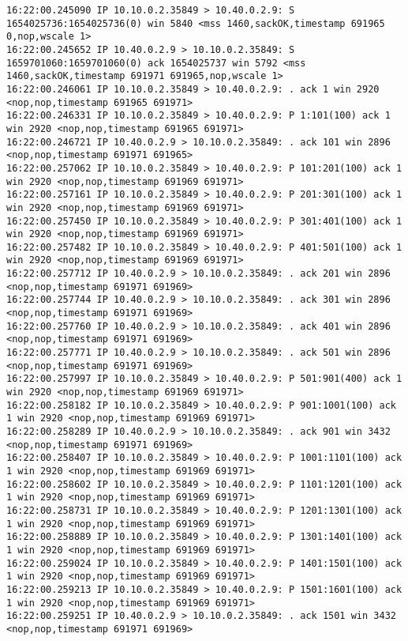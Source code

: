 \documentclass[a4paper,12pt]{article}
\begin{document}
\begin{Verbatim}
16:22:00.245090 IP 10.10.0.2.35849 > 10.40.0.2.9: S 1654025736:1654025736(0) win 5840 <mss 1460,sackOK,timestamp 691965 0,nop,wscale 1>
16:22:00.245652 IP 10.40.0.2.9 > 10.10.0.2.35849: S 1659701060:1659701060(0) ack 1654025737 win 5792 <mss 1460,sackOK,timestamp 691971 691965,nop,wscale 1>
16:22:00.246061 IP 10.10.0.2.35849 > 10.40.0.2.9: . ack 1 win 2920 <nop,nop,timestamp 691965 691971>
16:22:00.246331 IP 10.10.0.2.35849 > 10.40.0.2.9: P 1:101(100) ack 1 win 2920 <nop,nop,timestamp 691965 691971>
16:22:00.246721 IP 10.40.0.2.9 > 10.10.0.2.35849: . ack 101 win 2896 <nop,nop,timestamp 691971 691965>
16:22:00.257062 IP 10.10.0.2.35849 > 10.40.0.2.9: P 101:201(100) ack 1 win 2920 <nop,nop,timestamp 691969 691971>
16:22:00.257161 IP 10.10.0.2.35849 > 10.40.0.2.9: P 201:301(100) ack 1 win 2920 <nop,nop,timestamp 691969 691971>
16:22:00.257450 IP 10.10.0.2.35849 > 10.40.0.2.9: P 301:401(100) ack 1 win 2920 <nop,nop,timestamp 691969 691971>
16:22:00.257482 IP 10.10.0.2.35849 > 10.40.0.2.9: P 401:501(100) ack 1 win 2920 <nop,nop,timestamp 691969 691971>
16:22:00.257712 IP 10.40.0.2.9 > 10.10.0.2.35849: . ack 201 win 2896 <nop,nop,timestamp 691971 691969>
16:22:00.257744 IP 10.40.0.2.9 > 10.10.0.2.35849: . ack 301 win 2896 <nop,nop,timestamp 691971 691969>
16:22:00.257760 IP 10.40.0.2.9 > 10.10.0.2.35849: . ack 401 win 2896 <nop,nop,timestamp 691971 691969>
16:22:00.257771 IP 10.40.0.2.9 > 10.10.0.2.35849: . ack 501 win 2896 <nop,nop,timestamp 691971 691969>
16:22:00.257997 IP 10.10.0.2.35849 > 10.40.0.2.9: P 501:901(400) ack 1 win 2920 <nop,nop,timestamp 691969 691971>
16:22:00.258182 IP 10.10.0.2.35849 > 10.40.0.2.9: P 901:1001(100) ack 1 win 2920 <nop,nop,timestamp 691969 691971>
16:22:00.258289 IP 10.40.0.2.9 > 10.10.0.2.35849: . ack 901 win 3432 <nop,nop,timestamp 691971 691969>
16:22:00.258407 IP 10.10.0.2.35849 > 10.40.0.2.9: P 1001:1101(100) ack 1 win 2920 <nop,nop,timestamp 691969 691971>
16:22:00.258602 IP 10.10.0.2.35849 > 10.40.0.2.9: P 1101:1201(100) ack 1 win 2920 <nop,nop,timestamp 691969 691971>
16:22:00.258731 IP 10.10.0.2.35849 > 10.40.0.2.9: P 1201:1301(100) ack 1 win 2920 <nop,nop,timestamp 691969 691971>
16:22:00.258889 IP 10.10.0.2.35849 > 10.40.0.2.9: P 1301:1401(100) ack 1 win 2920 <nop,nop,timestamp 691969 691971>
16:22:00.259024 IP 10.10.0.2.35849 > 10.40.0.2.9: P 1401:1501(100) ack 1 win 2920 <nop,nop,timestamp 691969 691971>
16:22:00.259213 IP 10.10.0.2.35849 > 10.40.0.2.9: P 1501:1601(100) ack 1 win 2920 <nop,nop,timestamp 691969 691971>
16:22:00.259251 IP 10.40.0.2.9 > 10.10.0.2.35849: . ack 1501 win 3432 <nop,nop,timestamp 691971 691969>

\end{Verbatim}
\end{document}
